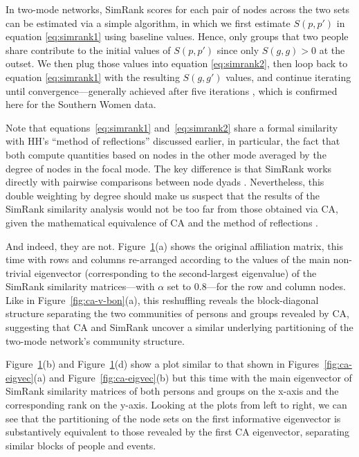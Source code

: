 \documentclass[a4paper,fleqn]{cas-sc}
\begin{document}
\begin{figure}
    \label{fig:simrank}
\end{figure}

In two-mode networks, SimRank scores for each pair of nodes across the two sets can be estimated via a simple algorithm, in which we first estimate $S(p, p')$ in equation \ref{eq:simrank1} using baseline values. Hence, only groups that two people share contribute to the initial values of $S(p, p')$ since only $S(g, g)>0$ at the outset. We then plug those values into equation \ref{eq:simrank2}, then loop back to equation \ref{eq:simrank1} with the resulting $S(g, g')$ values, and continue iterating until convergence---generally achieved after five iterations \citep{jeh2002simrank}, which is confirmed here for the Southern Women data. 

Note that equations~\ref{eq:simrank1} and~\ref{eq:simrank2} share a formal similarity with HH's ``method of reflections'' discussed earlier, in particular, the fact that both compute quantities based on nodes in the other mode averaged by the degree of nodes in the focal mode. The key difference is that SimRank works directly with pairwise comparisons between node dyads \citep{jeh2002simrank}. Nevertheless, this double weighting by degree should make us suspect that the results of the SimRank similarity analysis would not be too far from those obtained via CA, given the mathematical equivalence of CA and the method of reflections \citep{mealy2019interpreting, van2021correspondence}.

And indeed, they are not. Figure~\ref{fig:simrank}(a) shows the original affiliation matrix, this time with rows and columns re-arranged according to the values of the main non-trivial eigenvector (corresponding to the second-largest eigenvalue) of the SimRank similarity matrices---with $\alpha$ set to $0.8$---for the row and column nodes. Like in Figure~\ref{fig:ca-v-bon}(a), this reshuffling reveals the block-diagonal structure separating the two communities of persons and groups revealed by CA, suggesting that CA and SimRank uncover a similar underlying partitioning of the two-mode network's community structure. 

Figure~\ref{fig:simrank}(b) and Figure~\ref{fig:simrank}(d) show a plot similar to that shown in Figures~\ref{fig:ca-eigvec}(a) and Figure~\ref{fig:ca-eigvec}(b) but this time with the main eigenvector of SimRank similarity matrices of both persons and groups on the x-axis and the corresponding rank on the y-axis. Looking at the plots from left to right, we can see that the partitioning of the node sets on the first informative eigenvector is substantively equivalent to those revealed by the first CA eigenvector, separating similar blocks of people and events.  
\end{document}

